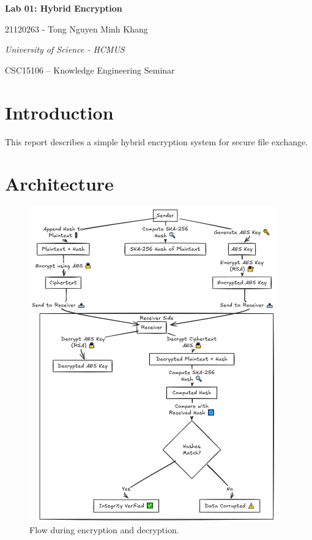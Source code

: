 \documentclass{article}
\begin{document}
\begin{titlepage}
\centering
{\LARGE\bfseries Lab 01: Hybrid Encryption}

\vspace{1cm}

{\large 21120263 - Tong Nguyen Minh Khang}

\vfill

{\itshape University of Science - HCMUS}

\vspace{0.5cm}
{CSC15106 – Knowledge Engineering Seminar}

\end{titlepage}

\section{Introduction}
This report describes a simple hybrid encryption system for secure file exchange.

\section{Architecture}

\begin{figure}[h]
    \centering
    \includegraphics[width=0.95\textwidth]{diagram.png}
    \caption{Flow during encryption and decryption.}
    \label{fig:sample}
\end{figure}
\end{document}

